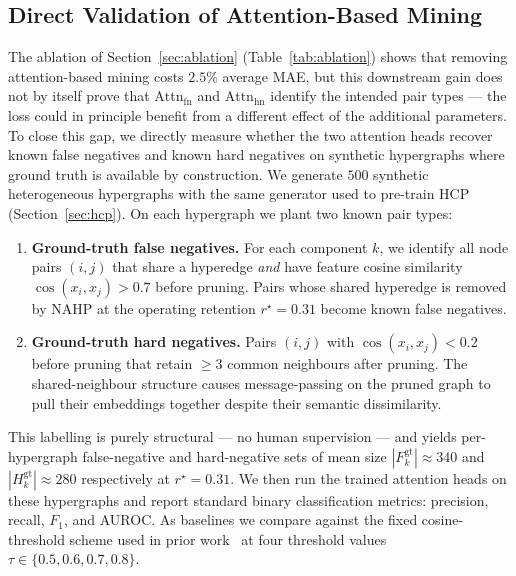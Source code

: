 \documentclass[10pt]{article}
\theoremstyle{plain}
\theoremstyle{definition}
\begin{document}
\subsection{Direct Validation of Attention-Based Mining}
\label{sec:attention_validation}
The ablation of Section~\ref{sec:ablation} (Table~\ref{tab:ablation}) shows that removing attention-based mining costs $2.5\%$ average MAE, but this downstream gain does not by itself prove that $\mathrm{Attn}_{\mathrm{fn}}$ and $\mathrm{Attn}_{\mathrm{hn}}$ identify the intended pair types --- the loss could in principle benefit from a different effect of the additional parameters. To close this gap, we directly measure whether the two attention heads recover known false negatives and known hard negatives on synthetic hypergraphs where ground truth is available by construction. We generate $500$ synthetic heterogeneous hypergraphs with the same generator used to pre-train HCP (Section~\ref{sec:hcp}). On each hypergraph we plant two known pair types:
\begin{enumerate}[label=(\arabic*),leftmargin=*,itemsep=2pt,topsep=2pt]
\item \textbf{Ground-truth false negatives.} For each component $k$, we identify all node pairs $(i,j)$ that share a hyperedge \emph{and} have feature cosine similarity $\cos(x_{i},x_{j})\!>\!0.7$ before pruning. Pairs whose shared hyperedge is removed by NAHP at the operating retention $r^{\star}\!=\!0.31$ become known false negatives.
\item \textbf{Ground-truth hard negatives.} Pairs $(i,j)$ with $\cos(x_{i},x_{j})\!<\!0.2$ before pruning that retain $\geq\!3$ common neighbours after pruning. The shared-neighbour structure causes message-passing on the pruned graph to pull their embeddings together despite their semantic dissimilarity.
\end{enumerate}
This labelling is purely structural --- no human supervision --- and yields per-hypergraph false-negative and hard-negative sets of mean size $|F_{k}^{\mathrm{gt}}|\!\approx\!340$ and $|H_{k}^{\mathrm{gt}}|\!\approx\!280$ respectively at $r^{\star}\!=\!0.31$.  We then run the trained attention heads on these hypergraphs and report standard binary classification metrics: precision, recall, $F_{1}$, and AUROC. As baselines we compare against the fixed cosine-threshold scheme used in prior work~\citep{xu2024contrastive,sun2023learning} at four threshold values $\tau\!\in\!\{0.5, 0.6, 0.7, 0.8\}$.
\end{document}

